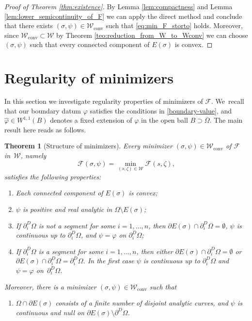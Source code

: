 \documentclass[JEP,XML,SOM,Unicode, NoFloatCountersInSection,published]{cedram}
\newcommand{\largercomp}{\mathcal W}
\let\Om\Omega
\newcommand\admclassconv{{\mathcal W_\mathrm{conv}}}
\newtheorem{theorem}{Theorem}[section]
\theoremstyle{definition}
\begin{document}
\begin{proof}[Proof of Theorem \ref{thm:existence}]
By Lemma \ref{lem:compactness} and Lemma \ref{lem:lower_semicontinuity_of_F} we can apply the direct method and conclude that there exists $(\sigma, \psi)\in\admclassconv$ such that
\eqref{eq:min_F_storto} holds. Moreover, since $\admclassconv\subset\largercomp$ by Theorem \eqref{teo:reduction_from_W_to_Wconv} we can choose $(\sigma,\psi)$ such that every connected component of $E(\sigma)$ is convex.
\end{proof}

\section{Regularity of minimizers}
\label{sec:regularity_of_minimizers}

In this section we investigate regularity properties of
minimizers of $\mathcal F$. We~recall that our boundary datum
$\varphi$
satisfies the conditions
in \eqref{boundary-value}, and $\widehat\varphi\in W^{1,1}(B)$ denotes a
fixed extension of $\varphi$ in the open ball $B\supset\overline\Omega$.
The main result here reads as follows.
\begin{theorem}[Structure of minimizers]
\label{teo:structure_of_minimizers}
Every minimizer $(\sigma,\psi)\in\admclassconv$ of $\mathcal F$ in~$\largercomp$, namely
\begin{equation*}
{\mathcal{F}}(\sigma,\psi)=\min_{(s,\zeta)\in\largercomp}
{\mathcal{F}}(s,\zeta),
\end{equation*}
satisfies the following properties:
\begin{enumerate}[{\rm(1)},wide]
\item\label{1.}
Each connected component of $E(\sigma)$ is convex;
\item\label{2.} $\psi$ is positive and real analytic
in $\Om\setminus E(\sigma)$;
\item\label{3.} If $\partial^D_i\Om$ is not
a segment
for some $i=1,\dots,n$, then $\partial E(\sigma)\cap
\partial_i^D\Om=\emptyset$, $\psi$ is continuous up to $\partial_i^D\Om$, and
$\psi=\varphi$ on $\partial_i^D\Om$;
\item\label{4.} If $\partial^D_i\Om$ is a segment for some $i=1,\dots,n$, then either $\partial E(\sigma)\cap
\partial_i^D\Om=\emptyset$ or $\partial E(\sigma)\cap
\partial_i^D\Om=\partial_i^D\Om$. In the first case $\psi$
is continuous up to $\partial_i^D\Om$ and
$\psi=\varphi$ on~$\partial_i^D\Om$.
\end{enumerate}
Moreover, there is a minimizer $(\sigma,\psi)\in\admclassconv$ such that
\begin{enumerate}[{\rm(5)},wide]
\item\label{5.}
$\Om\cap \partial E(\sigma)$ consists of a finite number of disjoint analytic curves, and $\psi$ is continuous and null on $\partial E(\sigma)\setminus \partial^D\Omega$.
\end{enumerate}
\end{theorem}
\end{document}
